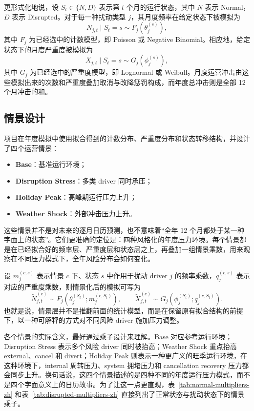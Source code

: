 \documentclass[UTF8,fontset=fandol,11pt]{ctexart}
\begin{document}
更形式化地说，设 \(S_t \in \{N,D\}\) 表示第 \(t\) 个月的运行状态，其中 \(N\) 表示 Normal，\(D\) 表示 Disrupted。对于每一种扰动类型 \(j\)，其月度频率在给定状态下被模拟为
\[
N_{j,t}\mid S_t=s \sim F_j\!\left(\theta_j^{(s)}\right),
\]
其中 \(F_j\) 为已经选中的计数模型，即 Poisson 或 Negative Binomial。相应地，给定状态下的月度严重度被模拟为
\[
X_{j,t}\mid S_t=s \sim G_j\!\left(\phi_j^{(s)}\right),
\]
其中 \(G_j\) 为已经选中的严重度模型，即 Lognormal 或 Weibull。月度运营冲击由这些模拟出来的次数和严重度叠加取消与改降惩罚构成，而年度总冲击则是全部 12 个月冲击的和。

\subsection{情景设计}
项目在年度模拟中使用拟合得到的计数分布、严重度分布和状态转移结构，并设计了四个运营情景：
\begin{itemize}
  \item \textbf{Base}：基准运行环境；
  \item \textbf{Disruption Stress}：多类 driver 同时承压；
  \item \textbf{Holiday Peak}：高峰期运行压力上升；
  \item \textbf{Weather Shock}：外部冲击压力上升。
\end{itemize}

这些情景并不是对未来的逐月日历预测，也不意味着“全年 12 个月都处于某一种字面上的状态”。它们更准确的定位是：四种风格化的年度压力环境。每个情景都是在已经拟合好的频率层、严重度层和状态层之上，再叠加一组情景乘数，用来观察在不同压力模式下，全年风险分布会如何变化。

设 \(m^{(c,s)}_j\) 表示情景 \(c\) 下、状态 \(s\) 中作用于扰动 driver \(j\) 的频率乘数，\(q^{(c,s)}_j\) 表示对应的严重度乘数，则情景化后的模拟可写为
\[
\tilde{N}^{(c)}_{j,t} \sim F_j\!\left(\theta_j^{(S_t)}; m^{(c,S_t)}_j\right),
\qquad
\tilde{X}^{(c)}_{j,t} \sim G_j\!\left(\phi_j^{(S_t)}; q^{(c,S_t)}_j\right).
\]
也就是说，情景层并不是推翻前面的统计模型，而是在保留原有拟合结构的前提下，以一种可解释的方式对不同风险 driver 施加压力调整。

各个情景的实际含义，最好通过乘子设计来理解。Base 对应参考运行环境；Disruption Stress 表示多个风险 driver 同时被抬高；Weather Shock 重点抬高 external、cancel 和 divert；Holiday Peak 则表示一种更广义的旺季运行环境，在这种环境下，internal 周转压力、system 拥堵压力和 cancellation recovery 压力都会同步上升。换句话说，这四个情景描述的是四种不同的年度运行压力模式，而不是四个字面意义上的日历故事。为了让这一点更直观，表~\ref{tab:normal-multipliers-zh} 和表~\ref{tab:disrupted-multipliers-zh} 直接列出了正常状态与扰动状态下的情景乘子。
\end{document}
